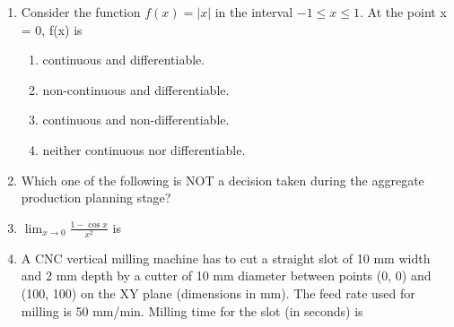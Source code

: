 \documentclass[journal,11pt,onecolumn]{IEEEtran}
\begin{document}
\begin{enumerate}
    \item Consider the function \(f(x) = |x|\) in the interval \(-1 \leq x \leq 1\). At the point x = 0, f(x) is

          \begin{enumerate}
              \item continuous and differentiable.
              \item non-continuous and differentiable.
              \item continuous and non-differentiable.
              \item neither continuous nor differentiable.
          \end{enumerate}

    \item Which one of the following is NOT a decision taken during the aggregate production planning stage?

          \begin{enumerate}
          \end{enumerate}

    \item \(\lim_{x \to 0} \frac{1-\cos x}{x^2}\) is

          \begin{enumerate}
          \end{enumerate}

    \item A CNC vertical milling machine has to cut a straight slot of 10 mm width and 2 mm depth by a cutter of 10 mm diameter between points (0, 0) and (100, 100) on the XY plane (dimensions in mm). The feed rate used for milling is 50 mm/min. Milling time for the slot (in seconds) is


\end{enumerate}
\end{document}
